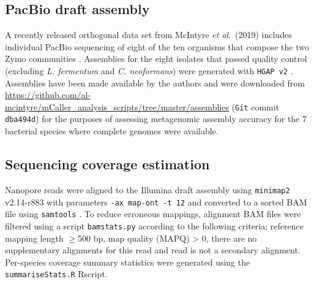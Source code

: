 \documentclass[a4paper,num-refs]{oup-contemporary}
\begin{document}
\subsection{PacBio draft assembly}
A recently released orthogonal data set from McIntyre \textit{et al}.\ (2019) includes individual PacBio sequencing of eight of the ten organisms that compose the two Zymo communities \cite{mcintyre2019single}.
Assemblies for the eight isolates that passed quality control (excluding \textit{L. fermentum} and \textit{C. neoformans}) were generated with \texttt{HGAP v2} \cite{chin2013nonhybrid}.
Assemblies have been made available by the authors and were downloaded from {\url{https://github.com/al-mcintyre/mCaller_analysis_scripts/tree/master/assemblies}} (\texttt{Git} commit \texttt{dba494d}) for the purposes of assessing metagenomic assembly accuracy for the 7 bacterial species where complete genomes were available.

\subsection{Sequencing coverage estimation}
Nanopore reads were aligned to the Illumina draft assembly using \texttt{minimap2} \cite{li2018minimap2} v2.14-r883 with parameters \texttt{-ax map-ont -t 12} and converted to a sorted BAM file using \texttt{samtools} \cite{li2009sequence}.
To reduce erroneous mappings, alignment BAM files were filtered using a script \texttt{bamstats.py} according to the following criteria; reference mapping length $\geq$500 bp, map quality (MAPQ) > 0, there are no supplementary alignments for this read and read is not a secondary alignment.
Per-species coverage summary statistics were generated using the \texttt{summariseStats.R} Rscript. 
\end{document}
